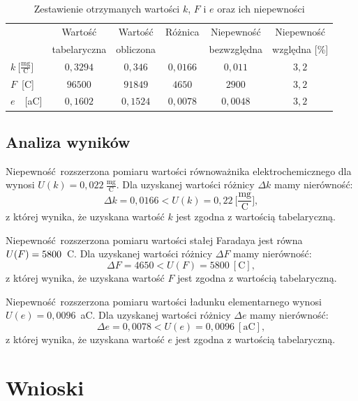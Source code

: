 \documentclass[12pt,a4paper]{article}
\numberwithin{equation}{section}
\begin{document}
\begin{table}[!ht]
	\caption{Zestawienie otrzymanych wartości $k$, $F$ i $e$ oraz ich niepewności}
	\centering
	\begin{tabular}{l|c|c|c|c|c}
		\hline & Wartość & Wartość & Różnica & Niepewność & Niepewność \\ 
		& tabelaryczna & obliczona &  & bezwzględna & względna [\%] \\ \hline \hline
		$k~\big[\frac{\textrm{mg}}{\textrm{C}}\big]$ & $0,3294$ & $0,346$ & $0,0166$ & $0,011$ & $3,2$   \\
		$F$~[C] & $96500$ & $91849$  & $4650$ & $2900$ & $3,2$ \\
		$e$~~[aC] & $0,1602$ & $0,1524$ & $ 0,0078$ & $0,0048$ & $3,2$ \\ \hline
	\end{tabular}
	\label{tab:tab2}
\end{table}

\subsection{Analiza wyników}

Niepewność rozszerzona pomiaru wartości równoważnika elektrochemicznego dla  wynosi $U(k) = 0,022~\frac{\textrm{mg}}{\textrm{C}}$.
Dla uzyskanej wartości różnicy $\Delta k$ mamy nierówność:
\begin{equation}
	\Delta k = 0,0166 < U(k) = 0,22~\Big[\frac{\textrm{mg}}{\textrm{C}}\Big],
\end{equation}
z której wynika, że uzyskana wartość $k$ jest zgodna z wartością tabelaryczną.

Niepewność rozszerzona pomiaru wartości stałej Faradaya jest równa $\\U(F) = 5800$~C.
Dla uzyskanej wartości różnicy $\Delta F$ mamy nierówność:
\begin{equation}
\Delta F = 4650 < U(F) = 5800~[\textrm{C}],
\end{equation}
z której wynika, że uzyskana wartość $F$ jest zgodna z wartością tabelaryczną.

Niepewność rozszerzona pomiaru wartości ładunku elementarnego wynosi $U(e) = 0,0096$~aC.
Dla uzyskanej wartości różnicy $\Delta e$ mamy nierówność:
\begin{equation}
\Delta e = 0,0078 < U(e) = 0,0096~[\textrm{aC}],
\end{equation}
z której wynika, że uzyskana wartość $e$ jest zgodna z wartością tabelaryczną.

\section{Wnioski}
\end{document}

